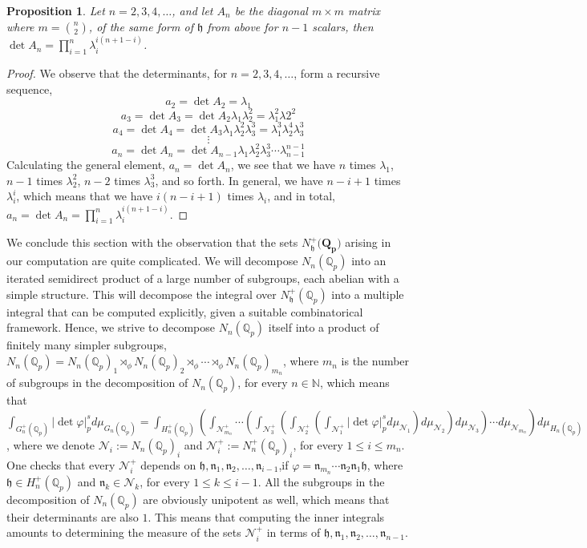 \documentclass[12pt]{article}
\newtheorem{proposition}[theorem]{Proposition}
\begin{document}
\begin{proposition}
\label{prop.h.matrix.determinant}
Let $n=2,3,4,\dots$, and let $A_n$ 
be the diagonal $m\times m$ matrix where $m=\binom{n}{2}$, of the same form of $\mathfrak{h}$ from above for $n-1$ scalars, then $\det A_n=\prod_{i=1}^{n}\lambda_i^{i(n+1-i)}$.
\end{proposition}
\begin{proof}
We observe that the determinants, for $n=2,3,4,\dots$, form a recursive sequence,
$$a_2=\det A_2=\lambda_1$$
$$a_3=\det A_3=\det A_2\lambda_1\lambda_2^2=\lambda_1^2\lambda2^2$$
$$a_4=\det A_4=\det A_3\lambda_1\lambda_2^2\lambda_3^3=\lambda_1^3\lambda_2^4\lambda_3^3$$
$$\vdots$$
$$a_n=\det A_n=\det A_{n-1}\lambda_1\lambda_2^2\lambda_3^3\cdots\lambda_{n-1}^{n-1}$$
Calculating the general element, $a_n=\det A_n$, we see that we have $n$ times $\lambda_1$, $n-1$ times $\lambda_2^2$, $n-2$ times $\lambda_3^3$, and so forth. In general, we have $n-i+1$ times $\lambda_i^i$, which means that we have $i(n-i+1)$ times $\lambda_i$, and in total, $a_n=\det A_n=\prod_{i=1}^n\lambda_i^{i(n+1-i)}$.
\end{proof}
We conclude this section with the observation that the sets $N_{\mathfrak{h}}^+(\mathbf{{Q}_p)}$ arising in our computation are quite complicated. We will decompose $N_n(\mathbb{Q}_p)$ into an iterated semidirect product of a large number of subgroups, each abelian with a simple structure. This will decompose the integral over $N_{\mathfrak{h}}^+(\mathbb{Q}_p)$ into a multiple integral that can be computed explicitly, given a suitable combinatorical framework. Hence, we strive to decompose $N_n(\mathbb{Q}_p)$ itself into a product of finitely many simpler subgroups, $N_n(\mathbb{Q}_p)= N_n(\mathbb{Q}_p)_1\rtimes_{\phi} N_n(\mathbb{Q}_p)_2\rtimes_{\phi}\cdots\rtimes_{\phi} N_n(\mathbb{Q}_p)_{m_n}$, where $m_n$ is the number of subgroups in the decomposition of $N_n(\mathbb{Q}_p)$, for every $n\in\mathbb{N}$, which means that $\displaystyle\int_{G_n^+(\mathbb{Q}_p)}|\det\varphi|_p^sd\mu_{G_n(\mathbb{Q}_p)}=\displaystyle\int_{H_n^+(\mathbb{Q}_p)}\left(\displaystyle\int_{\mathcal{N}^+_{m_n}}\cdots\left(\displaystyle\int_{\mathcal{N}^+_3}\left(\displaystyle\int_{\mathcal{N}^+_2}\left(\displaystyle\int_{\mathcal{N}^+_1}|\det\varphi|_p^sd\mu_{\mathcal{N}_1}\right)d\mu_{\mathcal{N}_2}\right)d\mu_{\mathcal{N}_3}\right)\cdots d\mu_{\mathcal{N}_{m_n}}\right)d\mu_{H_n(\mathbb{Q}_p)}$, where we denote $\mathcal{N}_i:=N_n(\mathbb{Q}_p)_i$ and $\mathcal{N}^+_i:=N_n^+(\mathbb{Q}_p)_i$, for every $1\leq i\leq m_n$. One checks that every $\mathcal{N}^+_i$ depends on $\mathfrak{h},\mathfrak{n}_1,\mathfrak{n}_2,\dots,\mathfrak{n}_{i-1}$,if $\varphi=\mathfrak{n}_{m_n}\cdots\mathfrak{n}_2\mathfrak{n}_1\mathfrak{h}$, where $\mathfrak{h}\in H_n^+(\mathbb{Q}_p)$ and $\mathfrak{n}_k\in\mathcal{N}_{k}$, for every $1\leq k\leq i-1$. 
All the subgroups in the decomposition of $N_n(\mathbb{Q}_p)$ are obviously unipotent as well, which means that their determinants are also $1$. This means that computing the inner integrals amounts to determining the measure of the sets $\mathcal{N}^+_i$ in terms of $\mathfrak{h},\mathfrak{n}_1,\mathfrak{n}_2,\dots,\mathfrak{n}_{n-1}$.
\end{document}
